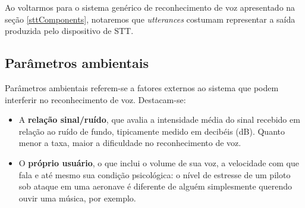 Ao voltarmos para o sistema genérico de reconhecimento de voz apresentado na seção \ref{sttComponents}, notaremos que \textit{utterances} costumam representar a saída produzida pelo dispositivo de STT.


\subsection{Parâmetros ambientais}

Parâmetros ambientais referem-se a fatores externos ao sistema que podem interferir no reconhecimento de voz. Destacam-se:

\begin{itemize}
\item A \textbf{relação sinal/ruído}, que avalia a intensidade média do sinal recebido em relação ao ruído de fundo, tipicamente medido em decibéis (dB). Quanto menor a taxa, maior a dificuldade no reconhecimento de voz.

\item O \textbf{próprio usuário}, o que inclui o volume de sua voz, a velocidade com que fala e até mesmo sua condição psicológica: o nível de estresse de um piloto sob ataque em uma aeronave é diferente de alguém simplesmente querendo ouvir uma música, por exemplo.
\end{itemize}
